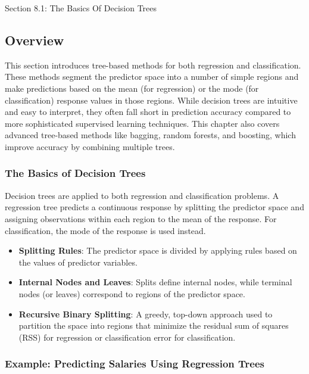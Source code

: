 \begin{notes}{Section 8.1: The Basics Of Decision Trees}
    \subsection*{Overview}

    This section introduces tree-based methods for both regression and classification. These methods segment the predictor space into a number of simple regions and make predictions based on the mean 
    (for regression) or the mode (for classification) response values in those regions. While decision trees are intuitive and easy to interpret, they often fall short in prediction accuracy compared 
    to more sophisticated supervised learning techniques. This chapter also covers advanced tree-based methods like bagging, random forests, and boosting, which improve accuracy by combining multiple trees.
    
    \subsubsection*{The Basics of Decision Trees}
    
    Decision trees are applied to both regression and classification problems. A regression tree predicts a continuous response by splitting the predictor space and assigning observations within each 
    region to the mean of the response. For classification, the mode of the response is used instead.
    
    \begin{highlight}
        \begin{itemize}
            \item \textbf{Splitting Rules}: The predictor space is divided by applying rules based on the values of predictor variables.
            \item \textbf{Internal Nodes and Leaves}: Splits define internal nodes, while terminal nodes (or leaves) correspond to regions of the predictor space.
            \item \textbf{Recursive Binary Splitting}: A greedy, top-down approach used to partition the space into regions that minimize the residual sum of squares (RSS) for regression or classification error for classification.
        \end{itemize}
    \end{highlight}
    
    \subsubsection*{Example: Predicting Salaries Using Regression Trees}
    

\end{notes}
